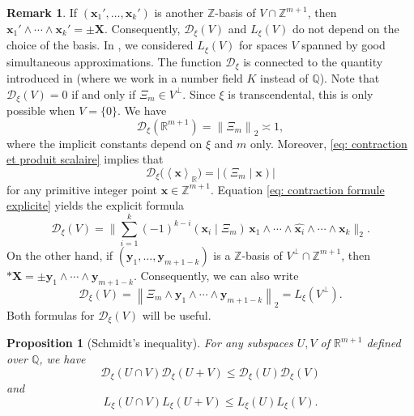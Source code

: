 \documentclass[JEP,XML,SOM,Unicode,NoFloatCountersInSection,published]{cedram}
\newcommand\bx{\boldsymbol{x}}
\newcommand\by{\boldsymbol{y}}
\newcommand\bX{\boldsymbol{X}}
\newcommand\bQ{\mathbb{Q}}
\newcommand\bR{\mathbb{R}}
\newcommand\bZ{\mathbb{Z}}
\newcommand\HHstar{\mathcal{D}_{\xi}}
\newcommand{\norm}[1]{\left\|#1 \right\|_2}
\newcommand{\bnorm}[1]{\biggl\|#1 \biggr\|_2}
\newcommand{\psc}[2]{\left(#1 \mid #2\right)}
\newcommand{\Vect}[2][]{\left\la #2\right\ra_{#1}}
\let\la\langle
\let\ra\rangle
\theoremstyle{definition}
\newtheorem*{remark*}{Remark}
\theoremstyle{plain}
\newtheorem{Prop}[Def]{Proposition}
\begin{document}
\begin{remark*}
If $(\bx_1',\dots,\bx_k')$ is another $\bZ$-basis of $V\cap \bZ^{m+1}$, then $\bx_1'\wedge \cdots \wedge\bx_k' = \pm \bX$. Consequently, $\HHstar(V)$ and $L_\xi(V)$ do not depend on the choice of the basis. In \cite{poels2022simultaneous}, we considered $L_\xi(V)$ for spaces $V$ spanned by good simultaneous approximations. The function $\HHstar$ is connected to the quantity introduced in \cite[Def.\,7.1]{poelsroy2022parametric} (where we work in a number field $K$ instead of $\bQ$). Note that $\HHstar(V) = 0$ if and only if $\Xi_m\in V^\perp$. Since $\xi$ is transcendental, this is only possible when $V=\{0\}$. We have
\begin{equation*}
\HHstar(\bR^{m+1}) = \norm{\Xi_m } \asymp 1,
\end{equation*}
where the implicit constants depend on $\xi$ and $m$ only. Moreover, \eqref{eq: contraction et produit scalaire} implies that
\begin{equation}
\label{eq: HHstar(bx)}
\HHstar\big(\Vect[\bR]{\bx}\big) = |\psc{\Xi_m}{\bx}|
\end{equation}
for any primitive integer point $\bx\in\bZ^{m+1}$. Equation \eqref{eq: contraction formule explicite} yields the explicit formula
\begin{equation}
\label{eq: HHstar(V) formule explicite}
\HHstar(V) = \bnorm{ \sum_{i=1}^{k} (-1)^{k-i}\psc{\bx_i}{\Xi_m} \, \bx_1\wedge \cdots \wedge \widehat{\bx_i} \wedge \cdots \wedge \bx_k }.
\end{equation}
On the other hand, if $(\by_1,\dots,\by_{m+1-k})$ is a $\bZ$-basis of $V^\perp\cap \bZ^{m+1}$, then $*\bX = \pm \by_1\wedge \cdots \wedge \by_{m+1-k}$. Consequently, we can also write
\begin{equation}
\label{eq: D_xi(V) = L_xi(V^perp)}
\HHstar(V) = \norm{\Xi_m \wedge \by_1\wedge\cdots \wedge \by_{m+1-k}} = L_\xi(V^\perp).
\end{equation}
Both formulas for $\HHstar(V) $ will be useful.
\end{remark*}

\begin{Prop}[Schmidt's inequality]
\label{Prop: Schmidt inegalite pour HHstar}
For any subspaces $U,V$ of $\bR^{m+1}$ defined over $\bQ$, we have
\begin{equation}
\label{eq: Schmidt's inequality HHstar}
\HHstar(U\cap V)\HHstar(U+V) \leq \HHstar(U)\HHstar(V)
\end{equation}
and
\begin{equation}
\label{eq: Schmidt's inequality L_xi}
L_\xi(U \cap V) L_\xi(U + V) \leq L_\xi(U)L_\xi(V).
\end{equation}
\end{Prop}
\end{document}
